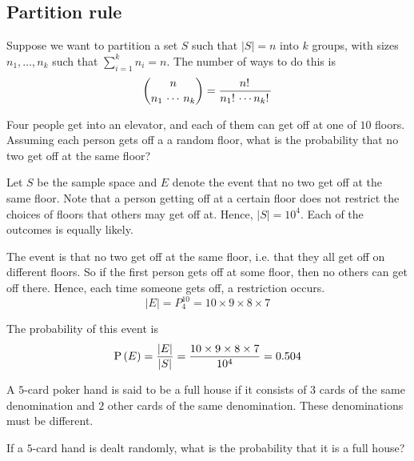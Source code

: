 \documentclass[11pt]{article}
\begin{document}
\subsection{Partition rule}
\label{sec:partition-rule}

Suppose we want to partition a set $S$ such that $|S| = n$ into $k$ groups,
with sizes $n_1, \ldots, n_k$ such that $\sum_{i=1}^k n_i = n$. The number of
ways to do this is
\begin{equation}
    \label{eq:partition-rule}
    \binom{n}{n_1 \, \cdots \, n_k}
    = \frac{n\fact}{n_1\fact \cdots n_k\fact}
\end{equation}

\begin{eg}
    Four people get into an elevator, and each of them can get off at one of
    $10$ floors. Assuming each person gets off a a random floor, what is the
    probability that no two get off at the same floor?
\end{eg}

\begin{solution}
    Let $S$ be the sample space and $E$ denote the event that no two get off at
    the same floor. Note that a person getting off at a certain floor does not
    restrict the choices of floors that others may get off at.
    Hence, $|S| = 10^4$. Each of the outcomes is equally likely.

    The event is that no two get off at the same floor, i.e. that they all get
    off on different floors. So if the first person gets off at some floor,
    then no others can get off there. Hence, each time someone gets off, a
    restriction occurs.
    \begin{equation*}
        |E| = P_4^{10} = 10 \times 9 \times 8 \times 7
    \end{equation*}

    The probability of this event is
    \begin{equation*}
        \P{E}
        = \frac{|E|}{|S|} = \frac{10 \times 9 \times 8 \times 7}{10^4}
        = 0.504
    \end{equation*}
\end{solution}

\begin{eg}
    A $5$-card poker hand is said to be a full house if it consists of $3$
    cards of the same denomination and $2$ other cards of the same
    denomination. These denominations must be different.

    If a $5$-card hand is dealt randomly, what is the probability that it is a
    full house?
\end{eg}
\end{document}
